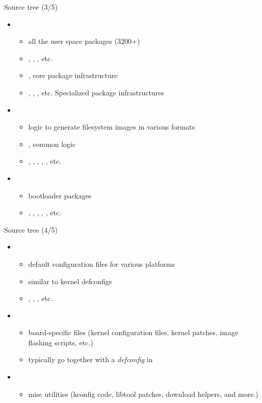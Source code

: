\begin{frame}{Source tree (3/5)}
  \begin{itemize}
  \item {}
    \begin{itemize}
    \item all the user space packages (3200+)
    \item {}, , , etc.
    \item {}, core package infrastructure
    \item {}, ,
      , etc. Specialized package infrastructures
    \end{itemize}
  \item {}
    \begin{itemize}
    \item logic to generate filesystem images in various formats
    \item {}, common logic
    \item {}, , , ,
      , etc.
    \end{itemize}
  \item {}
    \begin{itemize}
    \item bootloader packages
    \item {}, , ,
      , , etc.
    \end{itemize}
  \end{itemize}
\end{frame}

\begin{frame}{Source tree (4/5)}
  \begin{itemize}
  \item {}
    \begin{itemize}
    \item default configuration files for various platforms
    \item similar to kernel defconfigs
    \item {},
      , , etc.
    \end{itemize}
  \item {}
    \begin{itemize}
    \item board-specific files (kernel configuration files, kernel
      patches, image flashing scripts, etc.)
    \item typically go together with a {\em defconfig} in
    \end{itemize}
  \item {}
    \begin{itemize}
    \item misc utilities (kconfig code, libtool patches, download
      helpers, and more.)
    \end{itemize}
  \end{itemize}
\end{frame}

